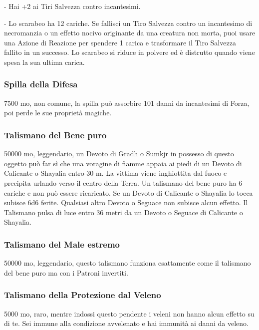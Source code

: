 \begin{multicols}{2}
	- Hai +2 ai Tiri Salvezza contro incantesimi.

	- Lo scarabeo ha 12 cariche. Se fallisci un Tiro Salvezza contro un incantesimo di necromanzia o un effetto nocivo originante da una creatura non morta, puoi usare una Azione di Reazione per spendere 1 carica e trasformare il Tiro Salvezza fallito in un successo. Lo scarabeo si riduce in polvere ed è distrutto quando viene spesa la sua ultima carica.

	\subsubsection*{Spilla della Difesa}

	7500 mo, non comune, la spilla può assorbire 101 danni da incantesimi di Forza, poi perde le sue proprietà magiche.

	\subsubsection*{Talismano del Bene puro}
	50000 mo, leggendario, un Devoto di Gradh o Sumkjr in possesso di questo oggetto può far sì che una voragine di fiamme appaia ai piedi di un Devoto di Calicante o Shayalia entro 30 m. La vittima viene inghiottita dal fuoco e precipita urlando verso il centro della Terra. Un talismano del bene puro ha 6 cariche e non può essere ricaricato. Se un Devoto di Calicante o Shayalia lo tocca subisce 6d6 ferite. Qualsiasi altro Devoto o Seguace non subisce alcun effetto. Il Talismano pulsa di luce entro 36 metri da un Devoto o Seguace di Calicante o Shayalia.

	\subsubsection*{Talismano del Male estremo}
	50000 mo, leggendario, questo talismano funziona esattamente come il talismano del bene puro ma con i Patroni invertiti.

	\subsubsection*{Talismano della Protezione dal Veleno}
	5000 mo, raro, mentre indossi questo pendente i veleni non hanno alcun effetto su di te. Sei immune alla condizione avvelenato e hai immunità ai danni da veleno.


\end{multicols}
